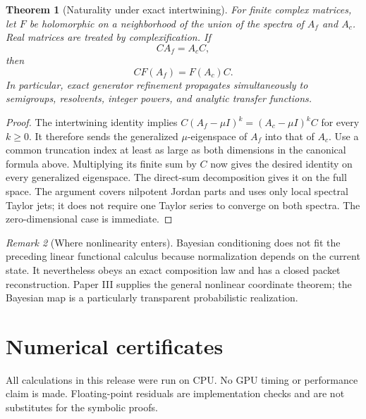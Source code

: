 \documentclass[11pt]{article}
\newtheorem{theorem}{Theorem}[section]
\theoremstyle{definition}
\theoremstyle{remark}
\newtheorem{remark}[theorem]{Remark}
\begin{document}
\begin{theorem}[Naturality under exact intertwining]
For finite complex matrices, let $F$ be holomorphic on a neighborhood of the union of the spectra of $A_f$ and $A_c$. Real matrices are treated by complexification. If
\[
CA_f=A_cC,
\]
then
\[
\boxed{CF(A_f)=F(A_c)C.}
\]
In particular, exact generator refinement propagates simultaneously to semigroups, resolvents, integer powers, and analytic transfer functions.
\end{theorem}

\begin{proof}
The intertwining identity implies
$C(A_f-\mu I)^k=(A_c-\mu I)^kC$ for every $k\ge0$.
It therefore sends the generalized $\mu$-eigenspace of $A_f$ into that of $A_c$.
Use a common truncation index at least as large as both dimensions in the
canonical formula above. Multiplying its finite sum by $C$ now gives the desired
identity on every generalized eigenspace. The direct-sum decomposition gives
it on the full space. The argument covers nilpotent Jordan parts and uses only
local spectral Taylor jets; it does not require one Taylor series to converge
on both spectra. The zero-dimensional case is immediate.
\end{proof}

\begin{remark}[Where nonlinearity enters]
Bayesian conditioning does not fit the preceding linear functional calculus because normalization depends on the current state. It nevertheless obeys an exact composition law and has a closed packet reconstruction. Paper III supplies the general nonlinear coordinate theorem; the Bayesian map is a particularly transparent probabilistic realization.
\end{remark}

\section{Numerical certificates}

All calculations in this release were run on CPU. No GPU timing or performance claim is made. Floating-point residuals are implementation checks and are not substitutes for the symbolic proofs.
\end{document}

